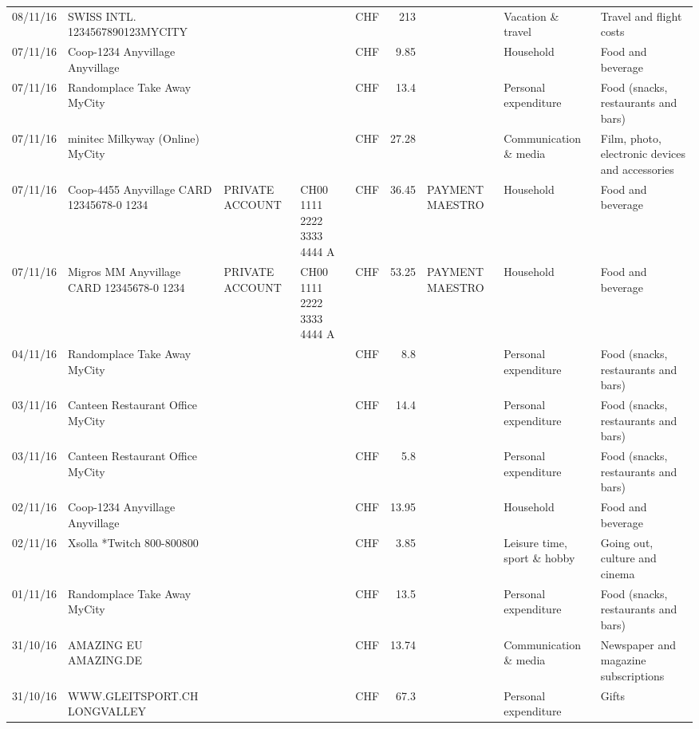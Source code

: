 \begin{landscape}
\begin{table}[h]
\begin{center}
\begin{tabular}{rllllrlll}
		08/11/16 & SWISS INTL. 1234567890123MYCITY &       &       & CHF   & 213   &       & Vacation \& travel & Travel and flight costs \\
		07/11/16 & Coop-1234 Anyvillage    Anyvillage &       &       & CHF   & 9.85  &       & Household & Food and beverage \\
		07/11/16 & Randomplace Take Away     MyCity &       &       & CHF   & 13.4  &       & Personal expenditure & Food (snacks, restaurants and bars) \\
		07/11/16 & minitec Milkyway (Online) MyCity &       &       & CHF   & 27.28 &       & Communication \& media & Film, photo, electronic devices and accessories \\
		07/11/16 & Coop-4455 Anyvillage CARD 12345678-0 1234 & PRIVATE ACCOUNT & CH00 1111 2222 3333 4444 A & CHF   & 36.45 & PAYMENT MAESTRO & Household & Food and beverage \\
		07/11/16 & Migros MM Anyvillage CARD 12345678-0 1234 & PRIVATE ACCOUNT & CH00 1111 2222 3333 4444 A & CHF   & 53.25 & PAYMENT MAESTRO & Household & Food and beverage \\
		04/11/16 & Randomplace Take Away     MyCity &       &       & CHF   & 8.8   &       & Personal expenditure & Food (snacks, restaurants and bars) \\
		03/11/16 & Canteen Restaurant Office      MyCity &       &       & CHF   & 14.4  &       & Personal expenditure & Food (snacks, restaurants and bars) \\
		03/11/16 & Canteen Restaurant Office      MyCity &       &       & CHF   & 5.8   &       & Personal expenditure & Food (snacks, restaurants and bars) \\
		02/11/16 & Coop-1234 Anyvillage    Anyvillage &       &       & CHF   & 13.95 &       & Household & Food and beverage \\
		02/11/16 & Xsolla *Twitch           800-800800 &       &       & CHF   & 3.85  &       & Leisure time, sport \& hobby & Going out, culture and cinema \\
		01/11/16 & Randomplace Take Away     MyCity &       &       & CHF   & 13.5  &       & Personal expenditure & Food (snacks, restaurants and bars) \\
		31/10/16 & AMAZING EU                AMAZING.DE &       &       & CHF   & 13.74 &       & Communication \& media & Newspaper and magazine subscriptions \\
		31/10/16 & WWW.GLEITSPORT.CH         LONGVALLEY &       &       & CHF   & 67.3  &       & Personal expenditure & Gifts \\

\end{tabular}
\end{center}
\end{table}
\end{landscape}
